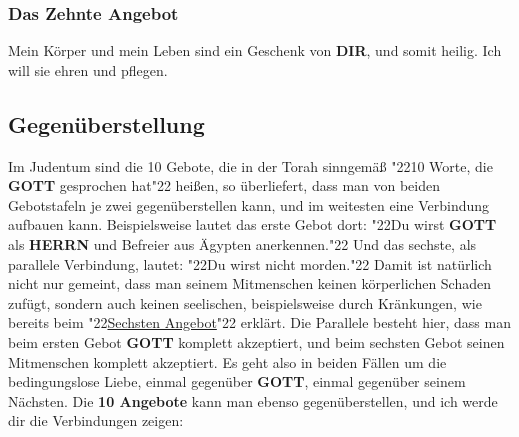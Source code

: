 \documentclass[10pt,a5paper]{article}
\newcommand{\Dir}[0]{\textbf{DIR}}
\newcommand{\Gott}[0]{\textbf{GOTT}}
\newcommand{\Herrn}[0]{\textbf{HERRN}}
\newcommand{\q}[1]{\char"22{#1}\char"22 }
\begin{document}
	\subsubsection{Das Zehnte Angebot} \label{DasZehnteAngebot}
		Mein K\"orper und mein Leben sind ein Geschenk von {\Dir},
		und somit heilig.
		Ich will sie ehren und pflegen.
	
	\subsection{Gegen\"uberstellung}
		Im Judentum sind die 10 Gebote,
		die in der Torah sinngem\"a{\ss} \q{10 Worte, die {\Gott} gesprochen hat} hei{\ss}en,
		so \"uberliefert,
		dass man von beiden Gebotstafeln je zwei gegen\"uberstellen kann,
		und im weitesten eine Verbindung aufbauen kann.
		Beispielsweise lautet das erste Gebot dort:
		\q{Du wirst {\Gott} als {\Herrn} und Befreier aus Ägypten anerkennen.}
		Und das sechste,
		als parallele Verbindung,
		lautet:
		\q{Du wirst nicht morden.}
		Damit ist nat\"urlich nicht nur gemeint,
		dass man seinem Mitmenschen keinen k\"orperlichen Schaden zuf\"ugt,
		sondern auch keinen seelischen,
		beispielsweise durch Kr\"ankungen,
		wie bereits beim \q{\hyperref[DasSechsteAngebot]{Sechsten Angebot}} erkl\"art.
		Die Parallele besteht hier,
		dass man beim ersten Gebot {\Gott} komplett akzeptiert,
		und beim sechsten Gebot seinen Mitmenschen komplett akzeptiert.
		Es geht also in beiden F\"allen um die bedingungslose Liebe,
		einmal gegen\"uber {\Gott},
		einmal gegen\"uber seinem N\"achsten.
		Die \textbf{10 Angebote} kann man ebenso gegen\"uberstellen,
		und ich werde dir die Verbindungen zeigen:
		\\
\end{document}
